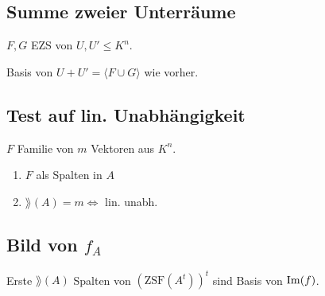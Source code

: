 \subsection*{Summe zweier Unterräume}
$F,G$ EZS von $U,U' \le K^n$.

Basis von $U+U'=\langle F \cup G \rangle$ wie vorher.

\subsection*{Test auf lin. Unabhängigkeit}
$F$ Familie von $m$ Vektoren aus $K^n$.

\begin{enumerate}
	\item $F$ als Spalten in $A$
	\item $\rang(A)=m \iff $ lin. unabh.
\end{enumerate}

\subsection*{Bild von $f_A$}
Erste $\rang(A)$ Spalten von $(\text{ZSF}(A^t))^t$ sind Basis von $\operatorname{Im}(f)$.
